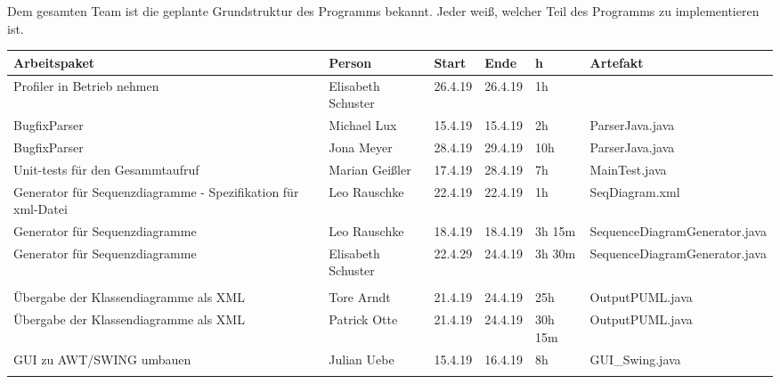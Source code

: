 Dem gesamten Team ist die geplante Grundstruktur des Programms bekannt. Jeder weiß, welcher Teil des Programms zu implementieren ist.
\nsecend
{}
\begin{longtable}{|p{4cm}|l|l|l|l|l|}
        \hline
        Arbeitspaket & Person & Start & Ende & h & Artefakt\\
        \hline
   
        Profiler in Betrieb nehmen & Elisabeth Schuster & 26.4.19 & 26.4.19 & 1h &  \\ \hline
        
        
        BugfixParser & Michael Lux & 15.4.19 & 15.4.19 & 2h & ParserJava.java\\ \hline
        
        BugfixParser & Jona Meyer & 28.4.19 & 29.4.19 & 10h & ParserJava.java\\ \hline
       
      

        Unit-tests für den Gesammtaufruf & Marian Geißler & 17.4.19 & 28.4.19 & 7h & MainTest.java\\ \hline


        Generator für Sequenzdiagramme - Spezifikation für xml-Datei & Leo Rauschke & 22.4.19 & 22.4.19 & 1h & SeqDiagram.xml\\ \hline
        
        Generator für Sequenzdiagramme & Leo Rauschke & 18.4.19 & 18.4.19 & 3h 15m & SequenceDiagramGenerator.java \\ \hline      
       Generator für Sequenzdiagramme & Elisabeth Schuster & 22.4.29 &  24.4.19 & 3h 30m & SequenceDiagramGenerator.java\\ \hline\\       
       Übergabe der Klassendiagramme als XML & Tore Arndt & 21.4.19  & 24.4.19 & 25h & OutputPUML.java\\ \hline
        Übergabe der Klassendiagramme als XML & Patrick Otte & 21.4.19  & 24.4.19 & 30h 15m & OutputPUML.java\\ \hline   
       GUI zu AWT/SWING umbauen & Julian Uebe & 15.4.19 & 16.4.19 & 8h & GUI\_Swing.java \\ \hline\\
       
        
       
\end{longtable}     
\nsecend

